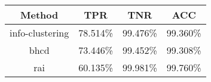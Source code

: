 \begin{tabular}{cccc}
\hline
     Method      &   TPR    &   TNR    &   ACC    \\
\hline
 info-clustering & 78.514\% & 99.476\% & 99.360\% \\
      bhcd       & 73.446\% & 99.452\% & 99.308\% \\
       rai       & 60.135\% & 99.981\% & 99.760\% \\
\hline
\end{tabular}